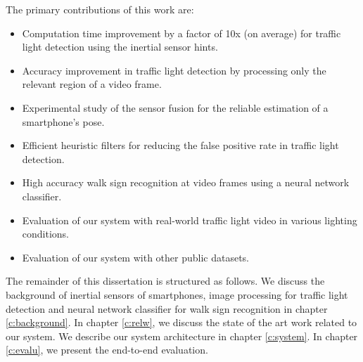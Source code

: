 The primary contributions of this work are:

\begin{itemize}
\item Computation time improvement by a factor of 10x (on average) for traffic light detection using the inertial sensor hints. 
\item Accuracy improvement in traffic light detection by processing only the relevant region of a video frame. 
\item Experimental study of the sensor fusion for the reliable estimation of a smartphone's pose. 
\item Efficient heuristic filters for reducing the false positive rate in traffic light detection.
\item High accuracy walk sign recognition at video frames using a neural network classifier.
\item Evaluation of our system with real-world traffic light video in various lighting conditions. 
\item Evaluation of our system with other public datasets.
  

\end{itemize}

The remainder of this dissertation is structured as follows.
We discuss the background of inertial sensors of smartphones, image processing for traffic light detection and neural network classifier for walk sign recognition in chapter \ref{c:background}.
In chapter \ref{c:relw}, we discuss the state of the art work related to our system.
We describe our system architecture in chapter \ref{c:system}.
In chapter \ref{c:evalu}, we present the end-to-end evaluation.
